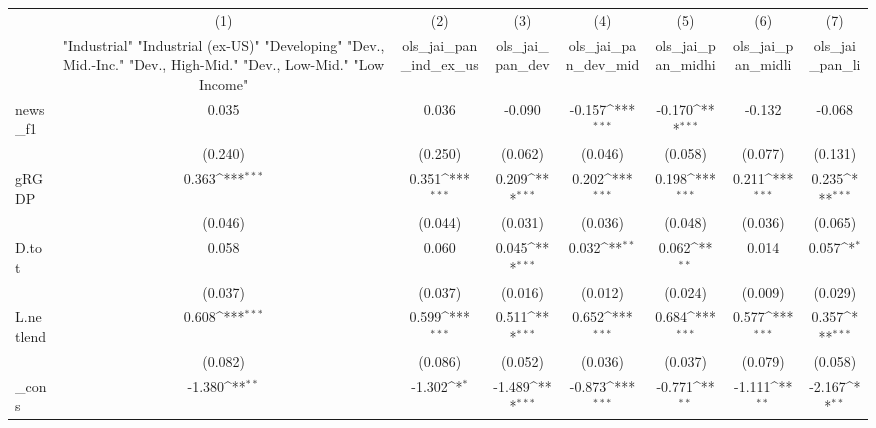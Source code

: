 {
\def\sym#1{\ifmmode^{#1}\else\(^{#1}\)\fi}
\begin{tabular}{l*{7}{c}}
\toprule
            &\multicolumn{1}{c}{(1)}&\multicolumn{1}{c}{(2)}&\multicolumn{1}{c}{(3)}&\multicolumn{1}{c}{(4)}&\multicolumn{1}{c}{(5)}&\multicolumn{1}{c}{(6)}&\multicolumn{1}{c}{(7)}\\
            &\multicolumn{1}{c}{ "Industrial" "Industrial (ex-US)" "Developing" "Dev., Mid.-Inc." "Dev., High-Mid."  "Dev., Low-Mid." "Low Income" }&\multicolumn{1}{c}{ols\_jai\_pan\_ind\_ex\_us}&\multicolumn{1}{c}{ols\_jai\_pan\_dev}&\multicolumn{1}{c}{ols\_jai\_pan\_dev\_mid}&\multicolumn{1}{c}{ols\_jai\_pan\_midhi}&\multicolumn{1}{c}{ols\_jai\_pan\_midli}&\multicolumn{1}{c}{ols\_jai\_pan\_li}\\
\midrule
news\_f1     &       0.035         &       0.036         &      -0.090         &      -0.157\sym{***}&      -0.170\sym{***}&      -0.132         &      -0.068         \\
            &     (0.240)         &     (0.250)         &     (0.062)         &     (0.046)         &     (0.058)         &     (0.077)         &     (0.131)         \\
\addlinespace
gRGDP       &       0.363\sym{***}&       0.351\sym{***}&       0.209\sym{***}&       0.202\sym{***}&       0.198\sym{***}&       0.211\sym{***}&       0.235\sym{***}\\
            &     (0.046)         &     (0.044)         &     (0.031)         &     (0.036)         &     (0.048)         &     (0.036)         &     (0.065)         \\
\addlinespace
D.tot       &       0.058         &       0.060         &       0.045\sym{***}&       0.032\sym{**} &       0.062\sym{**} &       0.014         &       0.057\sym{*}  \\
            &     (0.037)         &     (0.037)         &     (0.016)         &     (0.012)         &     (0.024)         &     (0.009)         &     (0.029)         \\
\addlinespace
L.netlend   &       0.608\sym{***}&       0.599\sym{***}&       0.511\sym{***}&       0.652\sym{***}&       0.684\sym{***}&       0.577\sym{***}&       0.357\sym{***}\\
            &     (0.082)         &     (0.086)         &     (0.052)         &     (0.036)         &     (0.037)         &     (0.079)         &     (0.058)         \\
\addlinespace
\_cons      &      -1.380\sym{**} &      -1.302\sym{*}  &      -1.489\sym{***}&      -0.873\sym{***}&      -0.771\sym{**} &      -1.111\sym{**} &      -2.167\sym{**} \\

\end{tabular}}
